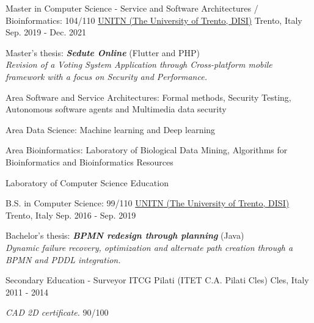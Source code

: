 

\begin{cventries}

\cventry
{Master in Computer Science - Service and Software Architectures / Bioinformatics: 104/110} %
{\href{https://www.unitn.it/}{UNITN (The University of Trento, DISI)}}  %
{Trento, Italy} %
{Sep. 2019 - Dec. 2021} %
{
  \begin{cvitems} %
    \item {Master's thesis: \textbf{\textit{Sedute Online}} (Flutter and PHP)\\\textit{Revision of a Voting System Application through Cross-platform mobile framework with a focus on Security and Performance.}}
    \item {Area Software and Service Architectures: Formal methods, Security Testing, Autonomous software agents and Multimedia data security}
    \item {Area Data Science: Machine learning and Deep learning}
    \item {Area Bioinformatics: Laboratory of Biological Data Mining, Algorithms for Bioinformatics and Bioinformatics Resources}
    \item {Laboratory of Computer Science Education}
  \end{cvitems}
}

\cventry
{B.S. in Computer Science: 99/110} %
{\href{https://www.unitn.it/}{UNITN (The University of Trento, DISI)}}  %
{Trento, Italy} %
{Sep. 2016 - Sep. 2019} %
{
  \begin{cvitems} %
    \item {Bachelor's thesis: \textbf{\textit{BPMN redesign through planning}} (Java)\\\textit{Dynamic failure recovery, optimization and alternate path creation through a BPMN and PDDL integration.}}
  \end{cvitems}
}

 \cventry
 {Secondary Education - Surveyor} %
 {ITCG Pilati (ITET C.A. Pilati Cles)} %
 {Cles, Italy} %
 {2011 - 2014} %
 {
   \begin{cvitems} %
     \item {\textit{CAD 2D certificate.}  90/100}
   \end{cvitems}
 }
\end{cventries}
